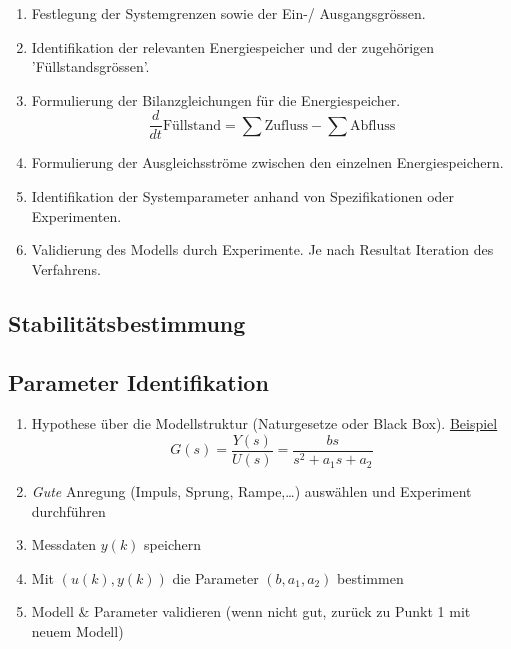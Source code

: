 \documentclass[
  10pt,
  a4paper,
  twocolumn]{article}
\newcommand{\VERB}{\Verb[commandchars=\\\{\}]}
\newcommand{\NormalTok}[1]{\textcolor[rgb]{0.14,0.16,0.18}{#1}}
\newcommand{\OperatorTok}[1]{\textcolor[rgb]{0.14,0.16,0.18}{#1}}
\newcommand{\VariableTok}[1]{\textcolor[rgb]{0.89,0.38,0.04}{#1}}
\providecommand{\tightlist}{%
  \setlength{\itemsep}{0pt}\setlength{\parskip}{0pt}}\usepackage{longtable,booktabs,array}
\numberwithin{equation}{section}
\begin{document}
\begin{enumerate}
\def\labelenumi{\arabic{enumi}.}
\tightlist
\item
  Festlegung der Systemgrenzen sowie der Ein-/ Ausgangsgrössen.
\item
  Identifikation der relevanten Energiespeicher und der zugehörigen
  'Füllstandsgrössen'.
\item
  Formulierung der Bilanzgleichungen für die Energiespeicher. \[
  \frac{d}{dt}\text{Füllstand} = \sum{\text{Zufluss}}-\sum{\text{Abfluss}}
  \]
\item
  Formulierung der Ausgleichsströme zwischen den einzelnen
  Energiespeichern.
\item
  Identifikation der Systemparameter anhand von Spezifikationen oder
  Experimenten.
\item
  Validierung des Modells durch Experimente. Je nach Resultat Iteration
  des Verfahrens.
\end{enumerate}

\hypertarget{stabilituxe4tsbestimmung}{%
\subsection{Stabilitätsbestimmung}\label{stabilituxe4tsbestimmung}}


\hypertarget{parameter-identifikation}{%
\subsection{Parameter Identifikation}\label{parameter-identifikation}}

\begin{enumerate}
\def\labelenumi{\arabic{enumi}.}
\tightlist
\item
  Hypothese über die Modellstruktur (Naturgesetze oder Black Box).
  \ul{Beispiel} \[
  G(s)=\frac{Y(s)}{U(s)}=\frac{bs}{s^2+a_1s+a_2}
  \]
\item
  \emph{Gute} Anregung (Impuls, Sprung, Rampe,\ldots) auswählen und
  Experiment durchführen
\item
  Messdaten \(y(k)\) speichern
\item
  Mit \((u(k), y(k))\) die Parameter \((b, a_1, a_2)\) bestimmen
\item
  Modell \& Parameter validieren (wenn nicht gut, zurück zu Punkt 1 mit
  neuem Modell)
\end{enumerate}
\end{document}
